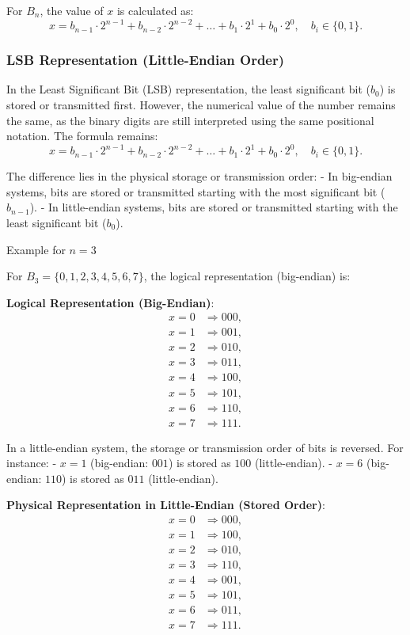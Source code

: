 For \( B_n \), the value of \( x \) is calculated as:
\[
x = b_{n-1} \cdot 2^{n-1} + b_{n-2} \cdot 2^{n-2} + \dots + b_1 \cdot 2^1 + b_0 \cdot 2^0, \quad b_i \in \{0, 1\}.
\]

\subsubsection{LSB Representation (Little-Endian Order)}
In the Least Significant Bit (LSB) representation, the least significant bit (\( b_0 \)) is stored or transmitted first. However, the numerical value of the number remains the same, as the binary digits are still interpreted using the same positional notation. The formula remains:
\[
x = b_{n-1} \cdot 2^{n-1} + b_{n-2} \cdot 2^{n-2} + \dots + b_1 \cdot 2^1 + b_0 \cdot 2^0, \quad b_i \in \{0, 1\}.
\]

The difference lies in the physical storage or transmission order:
- In big-endian systems, bits are stored or transmitted starting with the most significant bit (\( b_{n-1} \)).
- In little-endian systems, bits are stored or transmitted starting with the least significant bit (\( b_0 \)).


Example for \( n = 3 \)

For \( B_3 = \{0, 1, 2, 3, 4, 5, 6, 7\} \), the logical representation (big-endian) is:

\textbf{Logical Representation (Big-Endian)}:
\[
\begin{aligned}
x = 0 & \Rightarrow 000, \\
x = 1 & \Rightarrow 001, \\
x = 2 & \Rightarrow 010, \\
x = 3 & \Rightarrow 011, \\
x = 4 & \Rightarrow 100, \\
x = 5 & \Rightarrow 101, \\
x = 6 & \Rightarrow 110, \\
x = 7 & \Rightarrow 111.
\end{aligned}
\]

In a little-endian system, the storage or transmission order of bits is reversed. For instance:
- \( x = 1 \) (big-endian: \( 001 \)) is stored as \( 100 \) (little-endian).
- \( x = 6 \) (big-endian: \( 110 \)) is stored as \( 011 \) (little-endian).

\textbf{Physical Representation in Little-Endian (Stored Order)}:
\[
\begin{aligned}
x = 0 & \Rightarrow 000, \\
x = 1 & \Rightarrow 100, \\
x = 2 & \Rightarrow 010, \\
x = 3 & \Rightarrow 110, \\
x = 4 & \Rightarrow 001, \\
x = 5 & \Rightarrow 101, \\
x = 6 & \Rightarrow 011, \\
x = 7 & \Rightarrow 111.
\end{aligned}
\]

